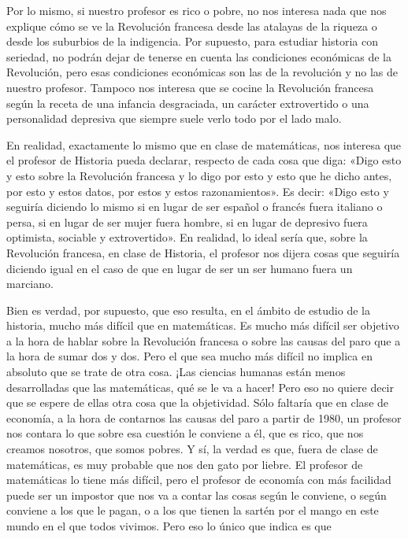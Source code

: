 \documentclass[draft,9pt,letterpaper,twocolumn,openany]{extbook}
\begin{document}
Por lo mismo, si nuestro profesor es rico o
pobre, no nos interesa nada que nos explique cómo se ve
la Revolución francesa desde las atalayas de la riqueza o
desde los suburbios de la indigencia. Por supuesto, para
estudiar historia con seriedad, no podrán dejar de tenerse
en cuenta las condiciones económicas de la Revolución,
pero esas condiciones económicas son las de la
revolución y no las de nuestro profesor. Tampoco nos
interesa que se cocine la Revolución francesa según la
receta de una infancia desgraciada, un carácter
extrovertido o una personalidad depresiva que siempre
suele verlo todo por el lado malo. 

En realidad,
exactamente lo mismo que en clase de matemáticas, nos
interesa que el profesor de Historia pueda declarar,
respecto de cada cosa que diga: «Digo esto y esto sobre
la Revolución francesa y lo digo por esto y esto que he
dicho antes, por esto y estos datos, por estos y estos
razonamientos». Es decir: «Digo esto y seguiría diciendo lo
mismo si en lugar de ser español o francés fuera italiano
o persa, si en lugar de ser mujer fuera hombre, si en lugar
de depresivo fuera optimista, sociable y extrovertido». En
realidad, lo ideal sería que, sobre la Revolución francesa,
en clase de Historia, el profesor nos dijera cosas que
seguiría diciendo igual en el caso de que en lugar de ser
un ser humano fuera un marciano. 

Bien es verdad, por
supuesto, que eso resulta, en el ámbito de estudio de la
historia, mucho más difícil que en matemáticas. Es mucho
más difícil ser objetivo a la hora de hablar sobre la
Revolución francesa o sobre las causas del paro que a la
hora de sumar dos y dos. Pero el que sea mucho más
difícil no implica en absoluto que se trate de otra cosa.
¡Las ciencias humanas están menos desarrolladas que las
matemáticas, qué se le va a hacer! Pero eso no quiere
decir que se espere de ellas otra cosa que la objetividad.
Sólo faltaría que en clase de economía, a la hora de
contarnos las causas del paro a partir de 1980, un
profesor nos contara lo que sobre esa cuestión le
conviene a él, que es rico, que nos creamos nosotros, que
somos pobres. Y sí, la verdad es que, fuera de clase de
matemáticas, es muy probable que nos den gato por
liebre. El profesor de matemáticas lo tiene más difícil,
pero el profesor de economía con más facilidad puede ser
un impostor que nos va a contar las cosas según le
conviene, o según conviene a los que le pagan, o a los
que tienen la sartén por el mango en este mundo en
el que todos vivimos. Pero eso lo único que indica es que
\end{document}
